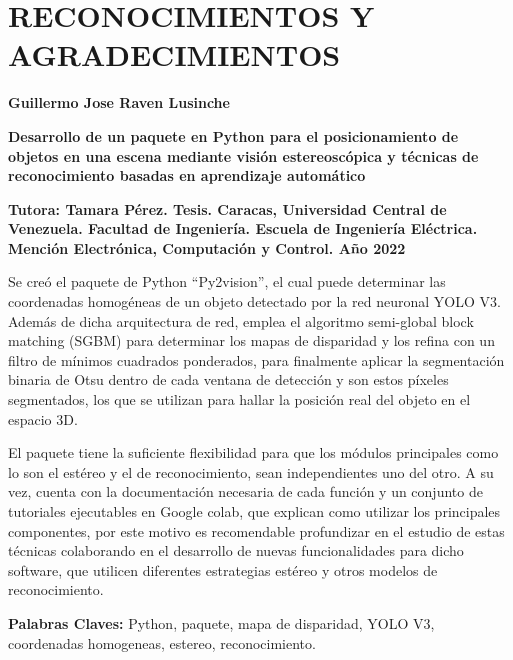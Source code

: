 \documentclass[letterpaper,titlepage,12pt,oneside,spanish,final]{report_eie}
\numberwithin{equation}{chapter}%
\numberwithin{figure}{chapter}%
\numberwithin{table}{chapter}%
\numberwithin{definition}{chapter}%
\numberwithin{lemma}{chapter}%
\numberwithin{theorem}{chapter}%
\numberwithin{corollary}{chapter}%
\numberwithin{condition}{chapter}%
\numberwithin{criterion}{chapter}%
\numberwithin{problem}{chapter}%
\numberwithin{property}{chapter}%
\numberwithin{proposition}{chapter}%
\numberwithin{solution}{chapter}%
\numberwithin{conjecture}{chapter}%
\begin{document}
\chapter*{RECONOCIMIENTOS Y AGRADECIMIENTOS}
%
%
\newpage
\renewcommand*{\abstract}{\begin{center}\end{center}}
\begin{spacing}{1}
\begin{center}%

\textbf{Guillermo Jose Raven Lusinche}

\begin{large}
\textbf{Desarrollo de un paquete en Python para el posicionamiento de objetos en una escena mediante visión estereoscópica y técnicas de reconocimiento basadas en aprendizaje automático}
\end{large}
\end{center}

\justifying
\textbf{Tutora: Tamara Pérez. Tesis.
Caracas, Universidad Central de Venezuela. Facultad de Ingeniería.
Escuela de Ingeniería Eléctrica. Mención Electrónica, Computación y Control. Año 2022}

Se creó el paquete de Python ``Py2vision'', el cual puede determinar las coordenadas homogéneas de un objeto detectado por la red neuronal YOLO V3. Además de dicha arquitectura de red, emplea el algoritmo semi-global block matching (SGBM) para determinar los mapas de disparidad y los refina con un filtro de mínimos cuadrados ponderados, para finalmente aplicar la segmentación binaria de Otsu dentro de cada ventana de detección y son estos píxeles segmentados, los que se utilizan para hallar la posición real del objeto en el espacio 3D. 
\vspace{0.2cm}

El paquete tiene la suficiente flexibilidad para que los módulos principales como lo son el estéreo y el de reconocimiento, sean independientes uno del otro. A su vez, cuenta con la documentación necesaria de cada función y un conjunto de tutoriales ejecutables en Google colab, que explican como utilizar los principales componentes, por este motivo es recomendable profundizar en el estudio de estas técnicas colaborando en el desarrollo de nuevas funcionalidades para dicho software, que utilicen diferentes estrategias estéreo y otros modelos de reconocimiento.

\vspace{0.2cm}

\textbf{Palabras Claves:} Python, paquete, mapa de disparidad, YOLO V3, coordenadas homogeneas, estereo, reconocimiento. \\[1ex]
\end{spacing}
\end{document}
